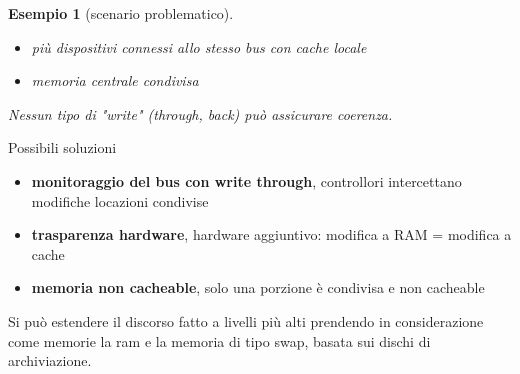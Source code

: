 \documentclass[12pt, a4paper]{article}
\theoremstyle{break}
\theoremstyle{lemma}
\theoremstyle{lemma}
\theoremstyle{lemma}
\newtheorem{esem}{Esempio}
\begin{document}
\begin{esem}[scenario problematico]
\begin{itemize}
	\item più dispositivi connessi allo stesso bus con cache locale
	\item memoria centrale condivisa
\end{itemize}
Nessun tipo di "write" (through, back) può assicurare coerenza.
\end{esem}
Possibili soluzioni
\begin{itemize}
	\item \textbf{monitoraggio del bus con write through}, controllori intercettano modifiche locazioni condivise
	\item \textbf{trasparenza hardware}, hardware aggiuntivo: modifica a RAM = modifica a cache
	\item \textbf{memoria non cacheable}, solo una porzione è condivisa e non cacheable
\end{itemize}
Si può estendere il discorso fatto a livelli più alti prendendo in considerazione come memorie la ram e la memoria di tipo swap, basata sui dischi di archiviazione. 
\end{document}
